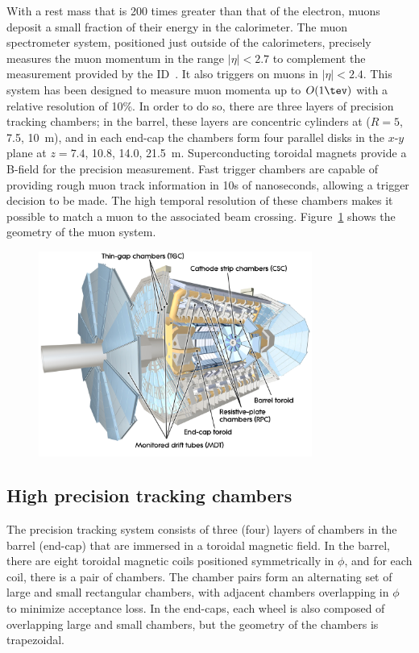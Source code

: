 
With a rest mass that is 200 times greater than that of the electron,
muons deposit a small fraction of their energy in the calorimeter. The
muon spectrometer system, positioned just outside of the calorimeters, precisely
measures the muon momentum in the range $|\eta| < 2.7$ to complement
the measurement provided by the ID~\cite{bib:Aad:2008zzm}. It also triggers on muons in
$|\eta|<2.4$. This system has been designed to measure muon momenta up
to $O(1 \tev)$ with a relative resolution of 10\%. In order to
do so, there are three layers of precision tracking chambers; in the
barrel, these layers are concentric cylinders at ($R=5$, 7.5, 10~m),
and in each end-cap the chambers form four parallel disks in the $x$-$y$
plane at $z=7.4$, 10.8, 14.0, 21.5~m. Superconducting toroidal magnets
provide a B-field for the precision measurement. Fast trigger chambers
are capable of providing rough muon track information in 10s of
nanoseconds, allowing a trigger decision to be made. The high temporal
resolution of these chambers makes it possible to match a muon to the
associated beam crossing. Figure~\ref{chap:detector:fig:muon_system}
shows the geometry of the muon system. 

\begin{figure}[ht]
    \centering
    \includegraphics[width=0.8\textwidth]{fig/detector/muon_system.pdf}
    \caption[]{}
\label{chap:detector:fig:muon_system}
\end{figure}

\subsection{High precision tracking chambers}

The precision tracking system consists of three (four) layers of
chambers in the barrel (end-cap) that are immersed in a toroidal
magnetic field. In the barrel, there are eight toroidal magnetic coils
positioned symmetrically in $\phi$, and for each coil, there is a pair
of chambers. The chamber pairs form an alternating set of large and
small rectangular chambers, with adjacent chambers overlapping in $\phi$ to
minimize acceptance loss. In the end-caps, each wheel is also composed
of overlapping large and small chambers, but the geometry of the
chambers is trapezoidal. 


